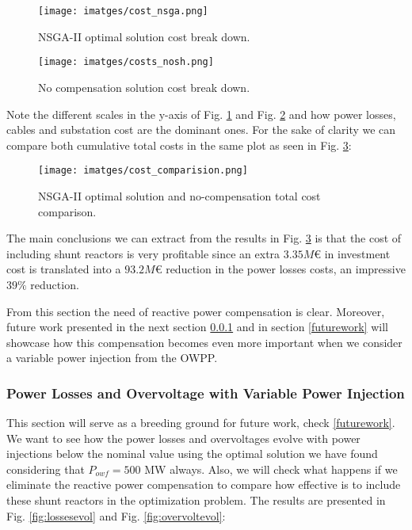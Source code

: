 \documentclass[a4paper,11pt, titlepage, twoside]{article}
\begin{document}
\begin{figure}[H]
    \centering
    \texttt{[image: imatges/cost\_nsga.png]}
    \caption{NSGA-II optimal solution cost break down.}
    \label{fig:nsgacosts}
\end{figure}

\begin{figure}[H]
    \centering
    \texttt{[image: imatges/costs\_nosh.png]}
    \caption{No compensation solution cost break down.}
    \label{fig:noshcosts}
\end{figure}
Note the different scales in the y-axis of Fig. \ref{fig:nsgacosts} and Fig. \ref{fig:noshcosts} and how power losses, cables and substation cost are the dominant ones. For the sake of clarity 
we can compare both cumulative total costs in the same plot as seen in Fig. \ref{fig:coparativecosts}:
\begin{figure}[H]
    \centering
    \texttt{[image: imatges/cost\_comparision.png]}
    \caption{NSGA-II optimal solution and no-compensation total cost comparison.}
    \label{fig:coparativecosts}
\end{figure}

The main conclusions we can extract from the results in Fig. \ref{fig:coparativecosts} is that the cost of including shunt reactors is very profitable since an extra
$ 3.35 M\euro$ in investment cost is translated into a $ 93.2 M\euro$ reduction in the power losses costs, an impressive $ 39 \% $ reduction.

From this section the need of reactive power compensation is clear. Moreover, future work presented in the next section \ref{injectionevol} and in section \ref{futurework} will showcase how this compensation becomes even more important when we consider 
a variable power injection from the OWPP.

\subsubsection{Power Losses and Overvoltage with Variable Power Injection} \label{injectionevol}

This section will serve as a breeding ground for future work, check \ref{futurework}. We want to see how the power losses and overvoltages evolve with power injections below the nominal value using the optimal solution we have found considering that $P_{owf} = 500$ MW always. Also, we will check what happens if we eliminate the reactive power compensation to 
compare how effective is to include these shunt reactors in the optimization problem.  The results are presented in
Fig. \ref{fig:lossesevol} and Fig. \ref{fig:overvoltevol}:
\end{document}
